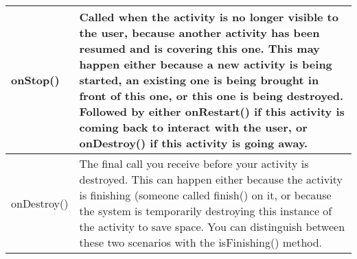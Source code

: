 \begin{table}[H]
\begin{tabular}{|l|p{12cm}|}
onStop()        &   Called when the activity is no longer visible to the user, because another activity has been resumed and is covering this one. This may happen either because a new activity is being started, an existing one is being brought in front of this one, or this one is being destroyed. Followed by either onRestart() if this activity is coming back to interact with the user, or onDestroy() if this activity is going away. \newline \\ \hline

onDestroy()     &   The final call you receive before your activity is destroyed. This can happen either because the activity is finishing (someone called finish() on it, or because the system is temporarily destroying this instance of the activity to save space. You can distinguish between these two scenarios with the isFinishing() method. \newline \\ \hline

\end{tabular}
\end{table}